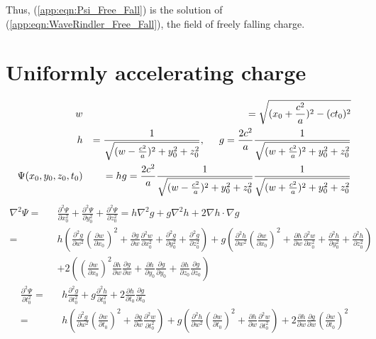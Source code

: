 \documentclass[prd,showpacs,preprint]{revtex4-1}
\begin{document}
\begin{appendix}
Thus, (\ref{app:eqn:Psi_Free_Fall}) is the solution of (\ref{app:eqn:WaveRindler_Free_Fall}), the field of freely falling charge.

\section{Uniformly accelerating charge\label{app:Psi_Accelerating}}
\begin{eqnarray}
w&&=\sqrt{(x_0+\frac{c^2}{a})^2-(ct_0)^2}\nonumber\\
h&&=\frac{1}{\sqrt{(w-\frac{c^2}{a})^2 + y_0^2 + z_0^2}},\hspace{5mm}
g=\frac{2c^2}{a}\frac{1}{\sqrt{(w+\frac{c^2}{a})^2+y_0^2+z_0^2}}\nonumber\\
\Psi(x_0,y_0,z_0,t_0)&&=hg=\frac{2c^2}{a}\frac{1}{\sqrt{(w-\frac{c^2}{a})^2 + y_0^2 + z_0^2}}
\frac{1}{\sqrt{(w+\frac{c^2}{a})^2+y_0^2+z_0^2}}
\end{eqnarray}
\begin{eqnarray}
\nabla^2\Psi=&&\frac{\partial^2 \Psi}{\partial x_0^2}+\frac{\partial^2 \Psi}{\partial y_0^2}+\frac{\partial^2 \Psi}{\partial z_0^2} = h\nabla^2 g + g\nabla^2 h + 2\nabla h\cdot\nabla g\nonumber\\
=&&h(\frac{\partial^2g}{\partial w^2}(\frac{\partial w}{\partial x_0})^2+\frac{\partial g}{\partial w}\frac{\partial^2 w}{\partial x_0^2}+\frac{\partial^2 g}{\partial y_0^2}+\frac{\partial^2 g}{\partial z_0^2}) + g(\frac{\partial^2h}{\partial w^2}(\frac{\partial w}{\partial x_0})^2+\frac{\partial h}{\partial w}\frac{\partial^2 w}{\partial x_0^2}+\frac{\partial^2 h}{\partial y_0^2}+\frac{\partial^2 h}{\partial z_0^2})\nonumber\\
&&+ 2((\frac{\partial w}{\partial x_0})^2\frac{\partial h}{\partial w}\frac{\partial g}{\partial w}+\frac{\partial h}{\partial y_0}\frac{\partial g}{\partial y_0}+\frac{\partial h}{\partial z_0}\frac{\partial g}{\partial z_0})
\end{eqnarray}
\begin{eqnarray}
\frac{\partial^2\Psi}{\partial t_0^2}=&&h\frac{\partial^2 g}{\partial t_0^2}+g\frac{\partial^2 h}{\partial t_0^2}+2\frac{\partial h}{\partial t_0}\frac{\partial g}{\partial t_0}\nonumber\\
=&&h(\frac{\partial^2 g}{\partial w^2}(\frac{\partial w}{\partial t_0})^2+\frac{\partial g}{\partial w}\frac{\partial^2 w}{\partial t_0^2}) + g(\frac{\partial^2 h}{\partial w^2}(\frac{\partial w}{\partial t_0})^2+\frac{\partial h}{\partial w}\frac{\partial^2 w}{\partial t_0^2})+2\frac{\partial h}{\partial w}\frac{\partial g}{\partial w}(\frac{\partial w}{\partial t_0})^2

\end{eqnarray}
\end{appendix}
\end{document}
